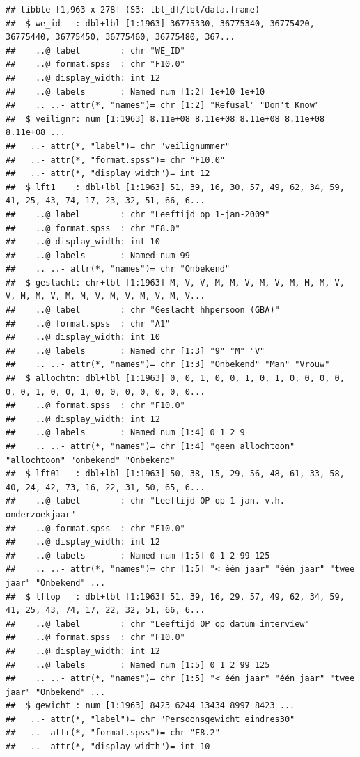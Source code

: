 \documentclass[
]{book}
\begin{document}
\begin{verbatim}
## tibble [1,963 x 278] (S3: tbl_df/tbl/data.frame)
##  $ we_id   : dbl+lbl [1:1963] 36775330, 36775340, 36775420, 36775440, 36775450, 36775460, 36775480, 367...
##    ..@ label        : chr "WE_ID"
##    ..@ format.spss  : chr "F10.0"
##    ..@ display_width: int 12
##    ..@ labels       : Named num [1:2] 1e+10 1e+10
##    .. ..- attr(*, "names")= chr [1:2] "Refusal" "Don't Know"
##  $ veilignr: num [1:1963] 8.11e+08 8.11e+08 8.11e+08 8.11e+08 8.11e+08 ...
##   ..- attr(*, "label")= chr "veilignummer"
##   ..- attr(*, "format.spss")= chr "F10.0"
##   ..- attr(*, "display_width")= int 12
##  $ lft1    : dbl+lbl [1:1963] 51, 39, 16, 30, 57, 49, 62, 34, 59, 41, 25, 43, 74, 17, 23, 32, 51, 66, 6...
##    ..@ label        : chr "Leeftijd op 1-jan-2009"
##    ..@ format.spss  : chr "F8.0"
##    ..@ display_width: int 10
##    ..@ labels       : Named num 99
##    .. ..- attr(*, "names")= chr "Onbekend"
##  $ geslacht: chr+lbl [1:1963] M, V, V, M, M, V, M, V, M, M, M, V, V, M, M, V, M, M, V, M, V, M, V, M, V...
##    ..@ label        : chr "Geslacht hhpersoon (GBA)"
##    ..@ format.spss  : chr "A1"
##    ..@ display_width: int 10
##    ..@ labels       : Named chr [1:3] "9" "M" "V"
##    .. ..- attr(*, "names")= chr [1:3] "Onbekend" "Man" "Vrouw"
##  $ allochtn: dbl+lbl [1:1963] 0, 0, 1, 0, 0, 1, 0, 1, 0, 0, 0, 0, 0, 0, 1, 0, 0, 1, 0, 0, 0, 0, 0, 0, 0...
##    ..@ format.spss  : chr "F10.0"
##    ..@ display_width: int 12
##    ..@ labels       : Named num [1:4] 0 1 2 9
##    .. ..- attr(*, "names")= chr [1:4] "geen allochtoon" "allochtoon" "onbekend" "Onbekend"
##  $ lft01   : dbl+lbl [1:1963] 50, 38, 15, 29, 56, 48, 61, 33, 58, 40, 24, 42, 73, 16, 22, 31, 50, 65, 6...
##    ..@ label        : chr "Leeftijd OP op 1 jan. v.h. onderzoekjaar"
##    ..@ format.spss  : chr "F10.0"
##    ..@ display_width: int 12
##    ..@ labels       : Named num [1:5] 0 1 2 99 125
##    .. ..- attr(*, "names")= chr [1:5] "< één jaar" "één jaar" "twee jaar" "Onbekend" ...
##  $ lftop   : dbl+lbl [1:1963] 51, 39, 16, 29, 57, 49, 62, 34, 59, 41, 25, 43, 74, 17, 22, 32, 51, 66, 6...
##    ..@ label        : chr "Leeftijd OP op datum interview"
##    ..@ format.spss  : chr "F10.0"
##    ..@ display_width: int 12
##    ..@ labels       : Named num [1:5] 0 1 2 99 125
##    .. ..- attr(*, "names")= chr [1:5] "< één jaar" "één jaar" "twee jaar" "Onbekend" ...
##  $ gewicht : num [1:1963] 8423 6244 13434 8997 8423 ...
##   ..- attr(*, "label")= chr "Persoonsgewicht eindres30"
##   ..- attr(*, "format.spss")= chr "F8.2"
##   ..- attr(*, "display_width")= int 10

\end{verbatim}
\end{document}
